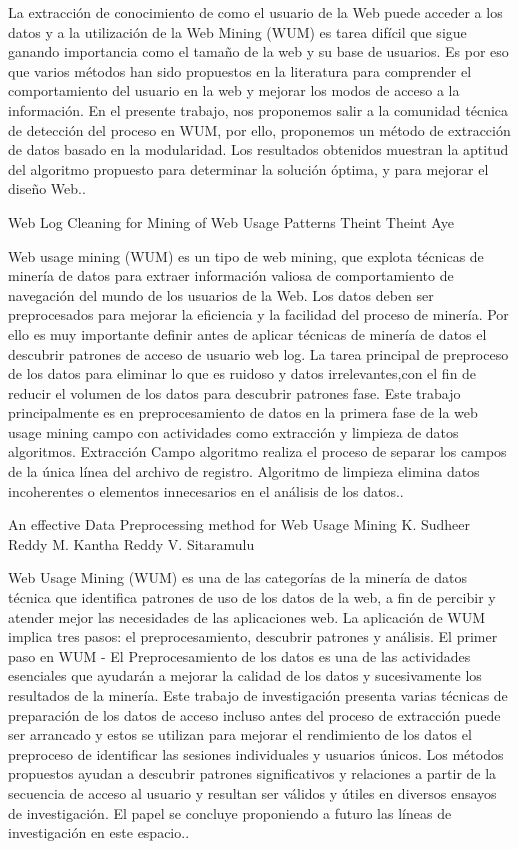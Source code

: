  La extracción de conocimiento de como el usuario de la Web puede acceder a los datos y a la utilización de la Web Mining (WUM) es tarea difícil que sigue ganando importancia como el tamaño de la web y su base de usuarios. Es por eso que varios métodos han sido propuestos en la literatura para comprender el comportamiento del usuario en la web y mejorar los modos de acceso a la información. En el presente trabajo, nos proponemos salir a la comunidad técnica de detección del proceso en WUM, por ello, proponemos un método de extracción de datos basado en la modularidad. Los resultados obtenidos muestran la aptitud del algoritmo propuesto para determinar la solución óptima, y para mejorar el diseño Web..


Web Log Cleaning for Mining of Web Usage Patterns
Theint Theint Aye

Web usage mining (WUM) es un tipo de web mining, que explota técnicas de minería de datos para extraer información valiosa de comportamiento de navegación del mundo de los usuarios de la Web. Los datos deben ser preprocesados para mejorar la eficiencia y la facilidad del proceso de minería. Por ello es muy importante definir antes de aplicar técnicas de minería de datos el descubrir patrones de acceso de usuario web log. La tarea principal de preproceso de los datos  para eliminar lo que es ruidoso y datos irrelevantes,con el fin de reducir el volumen de los datos para descubrir patrones fase. Este trabajo principalmente es en preprocesamiento de  datos en  la primera fase de la web usage mining campo con actividades como extracción y limpieza de datos algoritmos. Extracción Campo algoritmo realiza el proceso de separar los campos de la única línea del archivo de registro. Algoritmo de limpieza elimina datos incoherentes o elementos innecesarios en el análisis de los datos..



An effective Data Preprocessing method for Web Usage Mining
K. Sudheer Reddy 
M. Kantha Reddy
V. Sitaramulu

Web Usage Mining (WUM) es una de las categorías de la minería de datos técnica que identifica patrones de uso de los datos de la web, a fin de percibir y atender mejor las necesidades de las aplicaciones web. La aplicación de WUM implica tres pasos: el preprocesamiento, descubrir patrones y análisis. El primer paso en WUM - El Preprocesamiento de los datos es una de las actividades esenciales que ayudarán a mejorar la calidad de los datos y sucesivamente los resultados de la minería. Este trabajo de investigación presenta varias técnicas de preparación de los datos de acceso incluso antes del proceso de extracción puede ser arrancado y estos se utilizan para mejorar el rendimiento de los datos el preproceso de identificar las sesiones individuales y usuarios únicos. Los métodos propuestos  ayudan a descubrir patrones significativos y relaciones a partir de la secuencia de acceso al usuario y resultan ser válidos y útiles en diversos ensayos de investigación. El papel se concluye proponiendo a futuro las líneas de investigación en este espacio..



